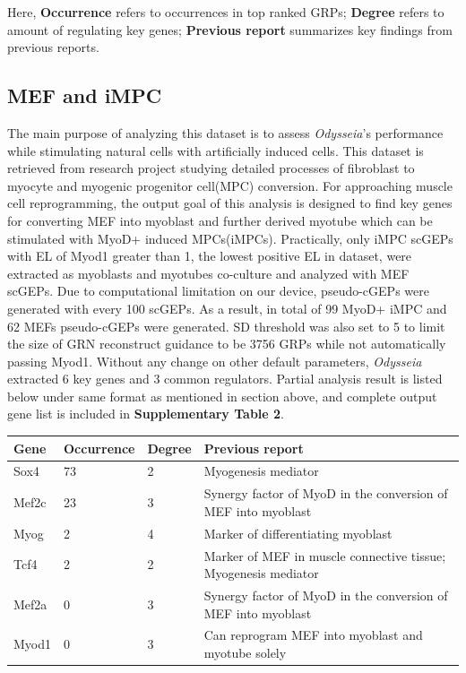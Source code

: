 \documentclass[fleqn,10pt]{wlscirep}
\begin{document}
Here, \textbf{Occurrence} refers to occurrences in top ranked GRPs; \textbf{Degree} refers to amount of regulating key genes; \textbf{Previous report} summarizes key findings from previous reports.

\subsection*{MEF and iMPC}
The main purpose of analyzing this dataset is to assess \emph{Odysseia}'s performance while stimulating natural cells with artificially induced cells.
This dataset is retrieved from research project studying detailed processes of fibroblast to myocyte and myogenic progenitor cell(MPC) conversion.\cite{mef_iMPC_ETH}
For approaching muscle cell reprogramming, the output goal of this analysis is designed to find key genes for converting MEF into myoblast and further derived myotube which can be stimulated with MyoD+ induced MPCs(iMPCs)\cite{mpc_as_myoblast}.
Practically, only iMPC scGEPs with EL of Myod1 greater than 1, the lowest positive EL in dataset, were extracted as myoblasts and myotubes co-culture and analyzed with MEF scGEPs.
Due to computational limitation on our device, pseudo-cGEPs were generated with every 100 scGEPs.
As a result, in total of 99 MyoD+ iMPC and 62 MEFs pseudo-cGEPs were generated.
SD threshold was also set to 5 to limit the size of GRN reconstruct guidance to be 3756 GRPs while not automatically passing Myod1.
Without any change on other default parameters, \emph{Odysseia} extracted 6 key genes and 3 common regulators.
Partial analysis result is listed below under same format as mentioned in section above, and complete output gene list is included in \textbf{Supplementary Table 2}.

\begin{table}[ht]
\centering
\begin{tabular}{|l|l|l|l|}
\hline
\textbf{Gene} & \textbf{Occurrence} & \textbf{Degree} & \textbf{Previous report}  \\
\hline
Sox4 & 73 & 2 & Myogenesis mediator\cite{sox4_2013, myogenic_repro_2018} \\
\hline
Mef2c & 23 & 3 & Synergy factor of MyoD in the conversion of MEF into myoblast\cite{mef2_2017, mef2_skeletal}\\
\hline
Myog & 2 & 4 & Marker of differentiating myoblast\cite{myog_1996, myog_2017} \\
\hline
Tcf4 & 2 & 2 & Marker of MEF in muscle connective tissue; Myogenesis mediator\cite{tcf4_2011, tcf4_2016, tcf4_2017}\\
\hline
Mef2a & 0 & 3 & Synergy factor of MyoD in the conversion of MEF into myoblast\cite{mef2_2017, mef2_skeletal}\\
\hline
Myod1 & 0 & 3 & Can reprogram MEF into myoblast and myotube solely\cite{mef_iMPC_ETH, myod_1990, myod_crispr} \\
\hline
\end{tabular}
\end{table}
\end{document}
